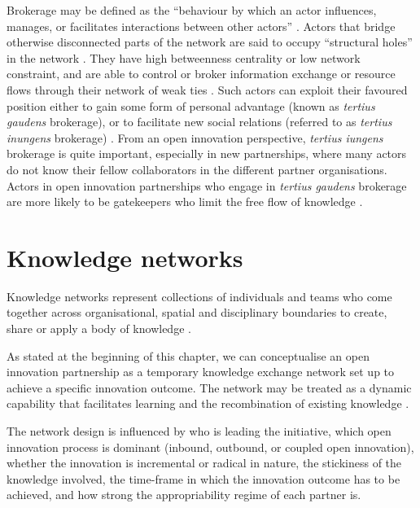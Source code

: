 Brokerage may be defined as the \enquote{behaviour by which an actor influences, manages, or facilitates interactions between other actors} \citep{obstfeld2014brokerage}. Actors that bridge otherwise disconnected parts of the network are said to occupy \enquote{structural holes} in the network \citep{burt1992structural}. They have high betweenness centrality or low network constraint, and are able to control or broker information exchange or resource flows through their network of weak ties \citep{burt1992structural,hanneman2005introduction,simpson2011network}. Such actors can exploit their favoured position either to gain some form of personal advantage (known as \textit{tertius gaudens} brokerage), or to facilitate new social relations (referred to as \textit{tertius inungens} brokerage) \citep{obstfeld2005social,obstfeld2014brokerage,quintane2016brokers}. From an open innovation perspective, \emph{tertius iungens} brokerage is quite important, especially in new partnerships, where many actors do not know their fellow collaborators in the different partner organisations. Actors in open innovation partnerships who engage in \emph{tertius gaudens} brokerage are more likely to be gatekeepers who limit the free flow of knowledge \citep{obstfeld2005social}.  \medskip 

\section{Knowledge networks}

Knowledge networks represent collections of individuals and teams who come together across organisational, spatial and disciplinary boundaries to create, share or apply a body of knowledge \citep{pugh2013designing}.  


As stated at the beginning of this chapter, we can conceptualise an open innovation partnership as a temporary knowledge exchange network set up to achieve a specific innovation outcome. The network may be treated as a dynamic capability that facilitates learning and the recombination of existing knowledge \citep{kogut1992knowledge, nahapiet1998social,rothaermel2007building,perez2013temporary,felin2016designing}. 

The network design is influenced by who is leading the initiative, which open innovation process is dominant (inbound, outbound, or coupled open innovation), whether the innovation is incremental or radical in nature, the stickiness of the knowledge involved, the time-frame in which the innovation outcome has to be achieved, and how strong the appropriability regime of each partner is. 

